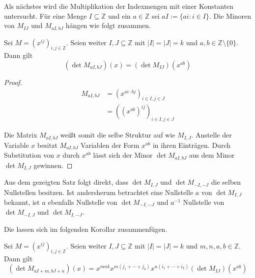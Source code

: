Als nächstes wird die Multiplikation der Indexmengen mit einer Konstanten untersucht. Für eine Menge $I \subseteq \mathbb{Z}$ und ein $a \in \mathbb{Z}$ sei $aI := \{ai:i\in I\}$. Die Minoren von $M_{IJ}$ und $M_{aI,bJ}$ hängen wie folgt zusammen.

\begin{satz} \label{satz:skalierung}
    Sei $M = \left( x^{ij} \right)_{i,j \in \mathbb{Z}}$. Seien weiter $I,J \subseteq \mathbb{Z}$ mit $|I|=|J|=k$ und $a,b \in \mathbb{Z}\setminus\{0\}$. Dann gilt
    \begin{equation*}
        \left( \det{} M_{aI,bJ} \right) (x) = \left( \det{} M_{IJ} \right) (x^{ab})
    \end{equation*}
\end{satz}

\begin{proof}    
    \begin{align*}
        M_{aI,bJ}   &= \left(x^{ai\cdot bj}\right)_{i\in I,j\in J} \\
                    &= \left((x^{ab})^{ij}\right)_{i\in I,j\in J}
    \end{align*}

    Die Matrix $M_{aI,bJ}$ weißt somit die selbe Struktur auf wie $M_{I,J}$. Anstelle der Variable $x$ besitzt $M_{aI,bJ}$ Variablen der Form $x^{ab}$ in ihren Einträgen. Durch Substitution von $x$ durch $x^{ab}$ lässt sich der Minor $\det M_{aI,bJ}$ aus dem Minor $\det M_{I,J}$ gewinnen.
\end{proof}

Aus dem gezeigten Satz folgt direkt, dass $\det{} M_{I,J}$ und $\det{} M_{-I,-J}$ die selben Nullstellen besitzen. Ist andersherum betrachtet eine Nullstelle $a$ von $\det M_{I,J}$ bekannt, ist $a$ ebenfalls Nullstelle von $\det M_{-I,-J}$ und $a^{-1}$ Nullstelle von $\det M_{-I,J}$ und $\det M_{I,-J}$.

Die  lassen sich im folgenden Korollar zusammenfügen.

\begin{korollar}
    Sei $M = \left( x^{ij} \right)_{i,j \in \mathbb{Z}}$. Seien weiter $I,J \subseteq \mathbb{Z}$ mit $|I|=|J|=k$ und $m,n,a,b \in \mathbb{Z}$. Dann gilt
    \begin{equation*}
        \left( \det{} M_{aI+m,bJ+n} \right) (x) = x^{mnk} x^{m(j_1 +\cdots + j_k)} x^{n(i_1+\cdots +i_k)} \left( \det{} M_{IJ} \right) (x^{ab})
    \end{equation*}
\end{korollar}


